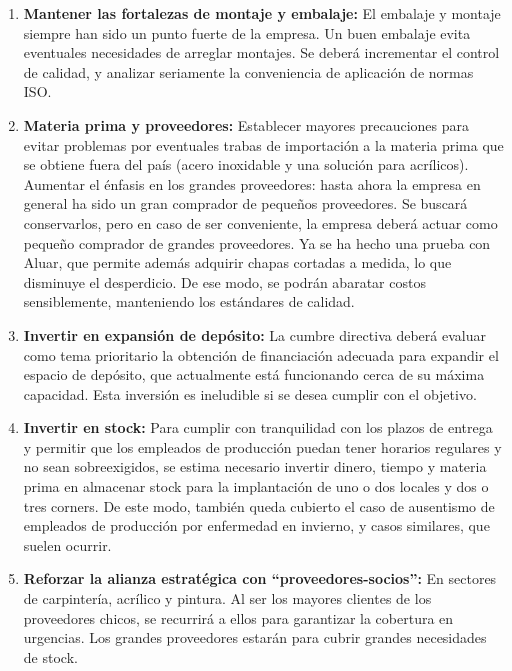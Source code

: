 \documentclass[a4paper,10pt,titlepage]{article}
\begin{document}
\begin{enumerate}
\item \textbf{Mantener las fortalezas de montaje y embalaje:} El embalaje y montaje siempre han sido un punto fuerte de la empresa. Un buen embalaje evita eventuales necesidades de arreglar montajes. Se deber\'a incrementar el control de calidad, y analizar seriamente la conveniencia de aplicaci\'on de normas ISO.

\item \textbf{Materia prima y proveedores:} Establecer mayores precauciones para evitar problemas por eventuales trabas de importaci\'on a la materia prima que se obtiene fuera del pa\'is (acero inoxidable y una soluci\'on para acr\'ilicos). Aumentar el \'enfasis en los grandes proveedores: hasta ahora la empresa en general ha sido un gran comprador de peque\~nos proveedores. Se buscar\'a conservarlos, pero en caso de ser conveniente, la empresa deber\'a actuar como peque\~no comprador de grandes proveedores. Ya se ha hecho una prueba con Aluar, que permite además adquirir chapas cortadas a medida, lo que disminuye el desperdicio. De ese modo, se podr\'an abaratar costos sensiblemente, manteniendo los est\'andares de calidad.

\item \textbf{Invertir en expansi\'on de dep\'osito:} La cumbre directiva deber\'a evaluar como tema prioritario la obtenci\'on de financiaci\'on adecuada para expandir el espacio de dep\'osito, que actualmente está funcionando cerca de su m\'axima capacidad. Esta inversi\'on es ineludible si se desea cumplir con el objetivo.

\item \textbf{Invertir en stock:} Para cumplir con tranquilidad con los plazos de entrega y permitir que los empleados de producci\'on puedan tener horarios regulares y no sean sobreexigidos, se estima necesario invertir dinero, tiempo y materia prima en almacenar stock para la implantaci\'on de uno o dos locales y dos o tres corners. De este modo, tambi\'en queda cubierto el caso de ausentismo de empleados de producci\'on por enfermedad en invierno, y casos similares, que suelen ocurrir.

\item \textbf{Reforzar la alianza estrat\'egica con ``proveedores-socios'':} En sectores de carpinter\'ia, acr\'ilico y pintura. Al ser los mayores clientes de los proveedores chicos, se recurrir\'a a ellos para garantizar la cobertura en urgencias. Los grandes proveedores estar\'an para cubrir grandes necesidades de stock.


\end{enumerate}
\end{document}
